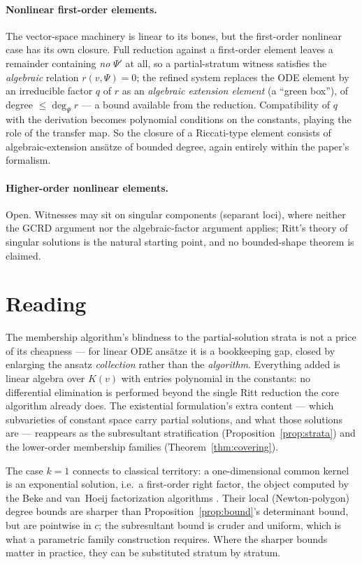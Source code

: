 \documentclass[11pt]{article}
\begin{document}
\paragraph{Nonlinear first-order elements.}
The vector-space machinery is linear to its bones, but the first-order
nonlinear case has its own closure. Full reduction against a first-order
element leaves a remainder containing \emph{no} $\Psi'$ at all, so a
partial-stratum witness satisfies the \emph{algebraic} relation
$r(v, \Psi) = 0$; the refined system replaces the ODE element by an
irreducible factor $q$ of $r$ as an \emph{algebraic extension element} (a
``green box''), of degree $\le \deg_\Psi r$ --- a bound available from the
reduction. Compatibility of $q$ with the derivation becomes polynomial
conditions on the constants, playing the role of the transfer map. So the
closure of a Riccati-type element consists of algebraic-extension ans\"atze
of bounded degree, again entirely within the paper's formalism.

\paragraph{Higher-order nonlinear elements.}
Open. Witnesses may sit on singular components (separant loci), where
neither the GCRD argument nor the algebraic-factor argument applies; Ritt's
theory of singular solutions is the natural starting point, and no
bounded-shape theorem is claimed.

\section{Reading}

The membership algorithm's blindness to the partial-solution strata is not a
price of its cheapness --- for linear ODE ans\"atze it is a bookkeeping gap,
closed by enlarging the ansatz \emph{collection} rather than the
\emph{algorithm}. Everything added is linear algebra over $K(v)$ with entries
polynomial in the constants: no differential elimination is performed beyond
the single Ritt reduction the core algorithm already does. The existential
formulation's extra content --- which subvarieties of constant space carry
partial solutions, and what those solutions are --- reappears as the
subresultant stratification (Proposition~\ref{prop:strata}) and the
lower-order membership families (Theorem~\ref{thm:covering}).

The case $k = 1$ connects to classical territory: a one-dimensional common
kernel is an exponential solution, i.e.\ a first-order right factor, the
object computed by the Beke and van~Hoeij factorization algorithms
\cite{beke,vanhoeij}. Their local (Newton-polygon) degree bounds are sharper
than Proposition~\ref{prop:bound}'s determinant bound, but are pointwise in
$c$; the subresultant bound is cruder and uniform, which is what a
parametric family construction requires. Where the sharper bounds matter in
practice, they can be substituted stratum by stratum.
\end{document}
